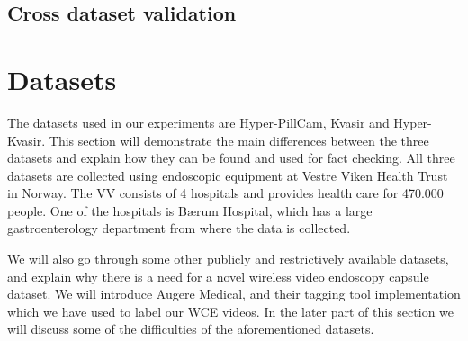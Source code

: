 \documentclass[thesis.tex]{subfiles}
\begin{document}
\subsection{Cross dataset validation}





\section{Datasets} \label{sec:available_datasets}

The datasets used in our experiments are Hyper-PillCam, Kvasir and Hyper-Kvasir. This section will demonstrate the main differences between the three datasets and explain how they can be found and used for fact checking. All three datasets are collected using endoscopic equipment at Vestre Viken Health Trust in Norway. The VV consists of 4 hospitals and provides health care for 470.000 people. One of the hospitals is Bærum Hospital, which has a large gastroenterology department from where the data is collected.

We will also go through some other publicly and restrictively available datasets, and explain why there is a need for a novel wireless video endoscopy capsule dataset. We will introduce Augere Medical, and their tagging tool implementation which we have used to label our WCE videos. In the later part of this section we will discuss some of the difficulties of the aforementioned datasets.
\end{document}
